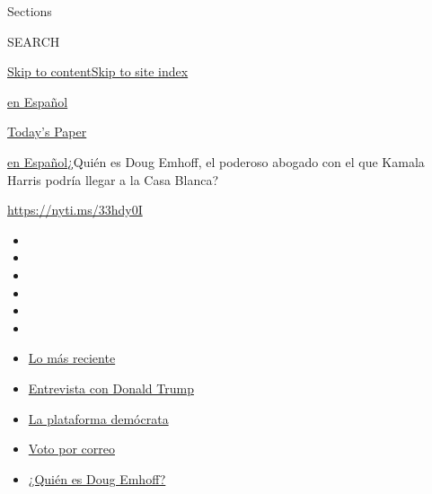 Sections

SEARCH

\protect\hyperlink{site-content}{Skip to
content}\protect\hyperlink{site-index}{Skip to site index}

\href{https://www.nytimes3xbfgragh.onion/es/}{en Español}

\href{https://myaccount.nytimes3xbfgragh.onion/auth/login?response_type=cookie\&client_id=vi}{}

\href{https://www.nytimes3xbfgragh.onion/section/todayspaper}{Today's
Paper}

\href{/es/}{en Español}\textbar{}¿Quién es Doug Emhoff, el poderoso
abogado con el que Kamala Harris podría llegar a la Casa Blanca?

\url{https://nyti.ms/33hdy0I}

\begin{itemize}
\item
\item
\item
\item
\item
\item
\end{itemize}

\begin{itemize}
\item
  \href{https://www.nytimes3xbfgragh.onion/es/2020/09/07/espanol/estados-unidos/trump-biden-encuestas-elecciones.html?action=click\&pgtype=Article\&state=default\&region=TOP_BANNER\&context=storylines_menu}{Lo
  más reciente}
\item
  \href{https://www.nytimes3xbfgragh.onion/es/2020/08/31/espanol/estados-unidos/donald-trump.html?action=click\&pgtype=Article\&state=default\&region=TOP_BANNER\&context=storylines_menu}{Entrevista
  con Donald Trump}
\item
  \href{https://www.nytimes3xbfgragh.onion/es/2020/08/21/espanol/estados-unidos/plataforma-democratas-espanol.html?action=click\&pgtype=Article\&state=default\&region=TOP_BANNER\&context=storylines_menu}{La
  plataforma demócrata}
\item
  \href{https://www.nytimes3xbfgragh.onion/es/article/voto-por-correo.html?action=click\&pgtype=Article\&state=default\&region=TOP_BANNER\&context=storylines_menu}{Voto
  por correo}
\item
  \href{https://www.nytimes3xbfgragh.onion/es/2020/09/11/espanol/doug-emhoff-esposo-kamala-harris.html?action=click\&pgtype=Article\&state=default\&region=TOP_BANNER\&context=storylines_menu}{¿Quién
  es Doug Emhoff?}
\end{itemize}

